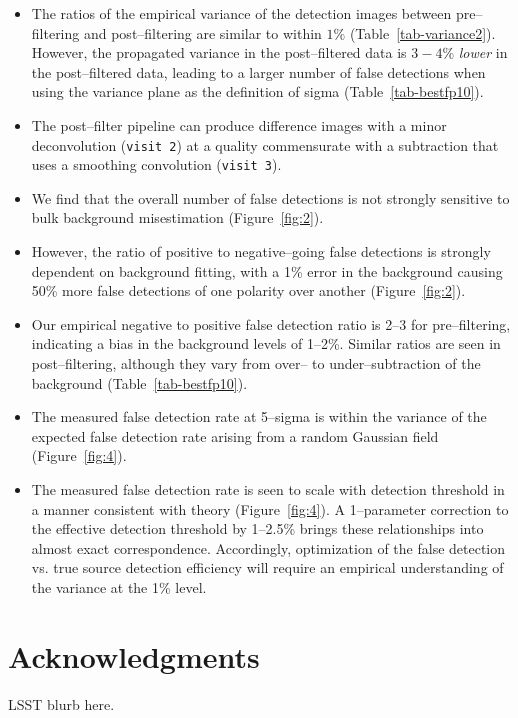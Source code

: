 \documentclass[iop]{emulateapj}
\begin{document}
\begin{itemize}
\item The ratios of the empirical variance of the detection images between pre--filtering and post--filtering are similar to within $1\%$ (Table~\ref{tab-variance2}).
  However, the propagated variance in the post--filtered data is $3-4\%$ {\it lower} in the post--filtered data, leading to a larger number of false detections when using the variance plane as the definition of sigma (Table~\ref{tab-bestfp10}).



\item The post--filter pipeline can produce difference images with a minor deconvolution ({\tt visit 2}) at a quality commensurate with a subtraction that uses a smoothing convolution ({\tt visit 3}).


\item We find that the overall number of false detections is not strongly sensitive to bulk background misestimation (Figure~\ref{fig:2}).

\item However, the ratio of positive to negative--going false detections is strongly dependent on background fitting, with a 1\% error in the background causing 50\% more false detections of one polarity over another (Figure~\ref{fig:2}).

\item Our empirical negative to positive false detection ratio is 2--3 for pre--filtering, indicating a bias in the background levels of 1--2\%.
  Similar ratios are seen in post--filtering, although they vary from over-- to under--subtraction of the background (Table~\ref{tab-bestfp10}).


\item The measured false detection rate at 5--sigma is within the variance of the expected false detection rate arising from a random Gaussian field (Figure~\ref{fig:4}).

\item The measured false detection rate is seen to scale with detection threshold in a manner consistent with theory (Figure~\ref{fig:4}).
  A 1--parameter correction to the effective detection threshold by 1--2.5\% brings these relationships into almost exact correspondence.
  Accordingly, optimization of the false detection vs. true source detection efficiency will require an empirical understanding of the variance at the 1\% level.

\end{itemize}

\section*{Acknowledgments}
LSST blurb here.



\end{document}
